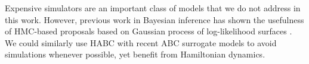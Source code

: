 \documentclass[]{article}
\begin{document}

Expensive simulators are an important class of models that we do not address in this work.  However, previous work in Bayesian inference has shown the usefulness of HMC-based proposals based on Gaussian process of log-likelihood surfaces \cite{rasmussen:2003}.   We could similarly use HABC with recent ABC surrogate models \cite{Meeds2014GpsUai,wilkinson:2014} to avoid simulations whenever possible, yet benefit from Hamiltonian dynamics.  

\clearpage


\end{document}

